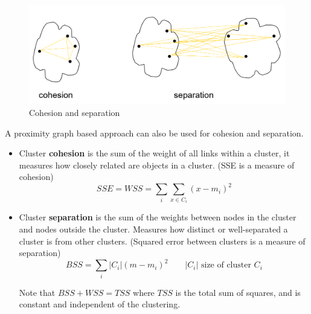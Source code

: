 \begin{figure}[htbp]
   \centering
   \includegraphics{images/05/cohesion.png}
   \caption{Cohesion and separation}
   \label{fig:05/cohesion}
\end{figure}
A proximity graph based approach can also be used for
cohesion and separation.
\begin{itemize}
	\item Cluster \textbf{cohesion} is the sum of the weight of all links within a cluster, it measures how closely related are objects in a cluster. (SSE is a measure of cohesion)
	\[
   SSE = WSS = \sum_i \sum_{x \in C_i}(x - m_i)^2
   \]
	\item Cluster \textbf{separation} is the sum of the weights between nodes in the cluster and nodes outside the cluster.
	Measures how distinct or well-separated a cluster is from other clusters. (Squared error between clusters is a measure of separation)
   \[
   BSS = \sum_i|C_i|(m-m_i)^2 \qquad |C_i| \text{ size of cluster } C_i
   \]

   Note that $BSS + WSS = TSS$ where $TSS$ is the total sum of squares, and is constant and independent of the clustering.
\end{itemize}


